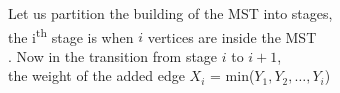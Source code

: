 \documentclass[preview]{standalone}
\begin{document}
\begin{center}
Let us partition the building of the MST into stages,\\ the i\textsuperscript{th} stage is when $i$ vertices are inside the MST\\. Now in the transition from stage $i$ to $i + 1$,\\ the weight of the added edge $X_i$ = min($Y_1, Y_2, \ldots, Y_i$)
\end{center}
\end{document}
